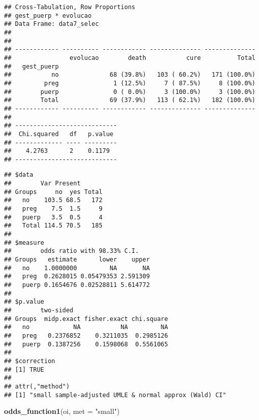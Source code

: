 \documentclass[
]{article}
\newenvironment{Shaded}{\begin{snugshade}}{\end{snugshade}}
\newcommand{\DataTypeTok}[1]{\textcolor[rgb]{0.13,0.29,0.53}{#1}}
\newcommand{\KeywordTok}[1]{\textcolor[rgb]{0.13,0.29,0.53}{\textbf{#1}}}
\newcommand{\NormalTok}[1]{#1}
\newcommand{\OperatorTok}[1]{\textcolor[rgb]{0.81,0.36,0.00}{\textbf{#1}}}
\newcommand{\StringTok}[1]{\textcolor[rgb]{0.31,0.60,0.02}{#1}}
\begin{document}
\begin{verbatim}
## Cross-Tabulation, Row Proportions  
## gest_puerp * evolucao  
## Data Frame: data7_selec  
## 
## 
## ------------ ---------- ------------ -------------- --------------
##                evolucao        death           cure          Total
##   gest_puerp                                                      
##           no              68 (39.8%)   103 ( 60.2%)   171 (100.0%)
##         preg               1 (12.5%)     7 ( 87.5%)     8 (100.0%)
##        puerp               0 ( 0.0%)     3 (100.0%)     3 (100.0%)
##        Total              69 (37.9%)   113 ( 62.1%)   182 (100.0%)
## ------------ ---------- ------------ -------------- --------------
## 
## ----------------------------
##  Chi.squared   df   p.value 
## ------------- ---- ---------
##    4.2763      2    0.1179  
## ----------------------------
\end{verbatim}

\begin{Shaded}
\end{Shaded}

\begin{verbatim}
## $data
##        Var Present
## Groups     no  yes Total
##   no    103.5 68.5   172
##   preg    7.5  1.5     9
##   puerp   3.5  0.5     4
##   Total 114.5 70.5   185
## 
## $measure
##        odds ratio with 98.33% C.I.
## Groups   estimate      lower    upper
##   no    1.0000000         NA       NA
##   preg  0.2628015 0.05479353 2.591309
##   puerp 0.1654676 0.02528811 5.614772
## 
## $p.value
##        two-sided
## Groups  midp.exact fisher.exact chi.square
##   no            NA           NA         NA
##   preg   0.2376852    0.3211035  0.2985126
##   puerp  0.1387256    0.1598068  0.5561065
## 
## $correction
## [1] TRUE
## 
## attr(,"method")
## [1] "small sample-adjusted UMLE & normal approx (Wald) CI"
\end{verbatim}

\begin{Shaded}
\begin{Highlighting}[]
\KeywordTok{odds_function1}\NormalTok{(oi, }\DataTypeTok{met =} \StringTok{"small"}\NormalTok{)}
\end{Highlighting}
\end{Shaded}
\end{document}
